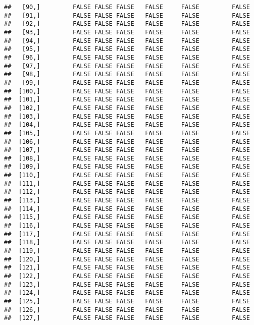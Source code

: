 \documentclass[
]{article}
\begin{document}
\begin{verbatim}
##   [90,]         FALSE FALSE FALSE   FALSE     FALSE         FALSE
##   [91,]         FALSE FALSE FALSE   FALSE     FALSE         FALSE
##   [92,]         FALSE FALSE FALSE   FALSE     FALSE         FALSE
##   [93,]         FALSE FALSE FALSE   FALSE     FALSE         FALSE
##   [94,]         FALSE FALSE FALSE   FALSE     FALSE         FALSE
##   [95,]         FALSE FALSE FALSE   FALSE     FALSE         FALSE
##   [96,]         FALSE FALSE FALSE   FALSE     FALSE         FALSE
##   [97,]         FALSE FALSE FALSE   FALSE     FALSE         FALSE
##   [98,]         FALSE FALSE FALSE   FALSE     FALSE         FALSE
##   [99,]         FALSE FALSE FALSE   FALSE     FALSE         FALSE
##  [100,]         FALSE FALSE FALSE   FALSE     FALSE         FALSE
##  [101,]         FALSE FALSE FALSE   FALSE     FALSE         FALSE
##  [102,]         FALSE FALSE FALSE   FALSE     FALSE         FALSE
##  [103,]         FALSE FALSE FALSE   FALSE     FALSE         FALSE
##  [104,]         FALSE FALSE FALSE   FALSE     FALSE         FALSE
##  [105,]         FALSE FALSE FALSE   FALSE     FALSE         FALSE
##  [106,]         FALSE FALSE FALSE   FALSE     FALSE         FALSE
##  [107,]         FALSE FALSE FALSE   FALSE     FALSE         FALSE
##  [108,]         FALSE FALSE FALSE   FALSE     FALSE         FALSE
##  [109,]         FALSE FALSE FALSE   FALSE     FALSE         FALSE
##  [110,]         FALSE FALSE FALSE   FALSE     FALSE         FALSE
##  [111,]         FALSE FALSE FALSE   FALSE     FALSE         FALSE
##  [112,]         FALSE FALSE FALSE   FALSE     FALSE         FALSE
##  [113,]         FALSE FALSE FALSE   FALSE     FALSE         FALSE
##  [114,]         FALSE FALSE FALSE   FALSE     FALSE         FALSE
##  [115,]         FALSE FALSE FALSE   FALSE     FALSE         FALSE
##  [116,]         FALSE FALSE FALSE   FALSE     FALSE         FALSE
##  [117,]         FALSE FALSE FALSE   FALSE     FALSE         FALSE
##  [118,]         FALSE FALSE FALSE   FALSE     FALSE         FALSE
##  [119,]         FALSE FALSE FALSE   FALSE     FALSE         FALSE
##  [120,]         FALSE FALSE FALSE   FALSE     FALSE         FALSE
##  [121,]         FALSE FALSE FALSE   FALSE     FALSE         FALSE
##  [122,]         FALSE FALSE FALSE   FALSE     FALSE         FALSE
##  [123,]         FALSE FALSE FALSE   FALSE     FALSE         FALSE
##  [124,]         FALSE FALSE FALSE   FALSE     FALSE         FALSE
##  [125,]         FALSE FALSE FALSE   FALSE     FALSE         FALSE
##  [126,]         FALSE FALSE FALSE   FALSE     FALSE         FALSE
##  [127,]         FALSE FALSE FALSE   FALSE     FALSE         FALSE

\end{verbatim}
\end{document}
